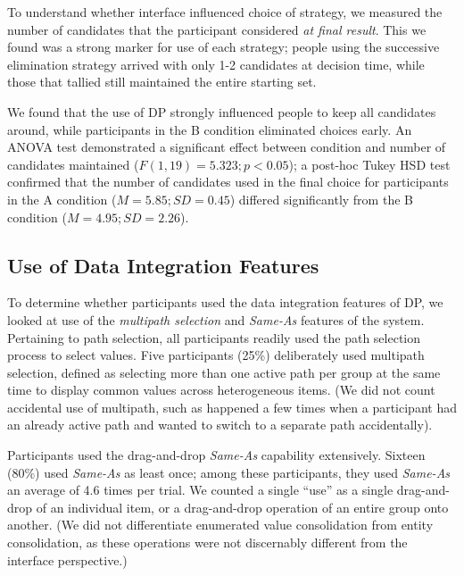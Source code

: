 \documentclass{sigchi}
\begin{document}
To understand whether interface influenced choice of strategy, we measured the number of candidates that the participant considered \emph{at final result}.  This we found was a strong marker for use of each strategy; people using the successive elimination strategy arrived with only 1-2 candidates at decision time, while those that tallied still maintained the entire starting set.  

We found that the use of DP strongly influenced people to keep all candidates around, while participants in the B condition eliminated choices early.  An ANOVA test demonstrated a significant effect between condition and number of candidates maintained ($F(1,19)=5.323; p<0.05$); a post-hoc Tukey HSD test confirmed that  the number of candidates used in the final choice for participants in the A condition ($M=5.85;SD=0.45$) differed significantly from the B condition ($M=4.95; SD=2.26$).

\subsection{Use of Data Integration Features}

To determine whether participants used the data integration features of DP, we looked at use of the \emph{multipath selection} and \emph{Same-As} features of the system.   Pertaining to path selection, all participants readily used the path selection process to select values.   Five participants (25\%) deliberately used multipath selection, defined as selecting more than one active path per group at the same time to display common values across heterogeneous items. (We did not count accidental use of multipath, such as happened a few times when a participant had an already active path and wanted to switch to a separate path accidentally).

Participants used the drag-and-drop \emph{Same-As} capability extensively. Sixteen (80\%) used \emph{Same-As} as least once; among these participants, they used \emph{Same-As} an average of 4.6 times per trial. We counted a single ``use'' as a single drag-and-drop of an individual item, or a drag-and-drop operation of an entire group onto another.  (We did not differentiate enumerated value consolidation from entity consolidation, as these operations were not discernably different from the interface perspective.)

\end{document}
